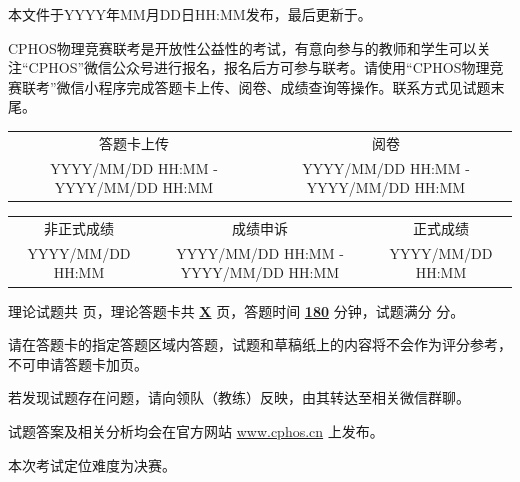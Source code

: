 \documentclass[exam]{cphos}
\begin{document}
\maketitlepage

{\kaiti\small 本文件于YYYY年MM月DD日HH:MM发布，最后更新于\compiletime 。}

{\kaiti\small CPHOS物理竞赛联考是开放性公益性的考试，有意向参与的教师和学生可以关注“CPHOS”微信公众号进行报名，报名后方可参与联考。请使用“CPHOS物理竞赛联考”微信小程序完成答题卡上传、阅卷、成绩查询等操作。联系方式见试题末尾。}
\begin{examschedule}
\begin{tabular}{@{}cc@{}}
    答题卡上传 & 阅卷 \\
    YYYY/MM/DD HH:MM - YYYY/MM/DD HH:MM & YYYY/MM/DD HH:MM - YYYY/MM/DD HH:MM \\
\end{tabular}

\vspace{0.3em}

\begin{tabular}{@{}ccc@{}}
    非正式成绩 & 成绩申诉 & 正式成绩 \\
    YYYY/MM/DD HH:MM & YYYY/MM/DD HH:MM - YYYY/MM/DD HH:MM & YYYY/MM/DD HH:MM \\
\end{tabular}
\end{examschedule}

\begin{examnotes}
    \item 理论试题共 \textbf{\underline{\cphostotalpages}} 页，理论答题卡共 \textbf{\underline{X}} 页，答题时间 \textbf{\underline{180}} 分钟，试题满分 \textbf{\underline{\cphostotalscore}} 分。
    \item 请在答题卡的指定答题区域内答题，试题和草稿纸上的内容将不会作为评分参考，不可申请答题卡加页。
    \item 若发现试题存在问题，请向领队（教练）反映，由其转达至相关微信群聊。
    \item 试题答案及相关分析均会在官方网站 \url{www.cphos.cn} 上发布。
    \item 本次考试定位难度为决赛。
\end{examnotes}
\vspace{1em}
\end{document}

